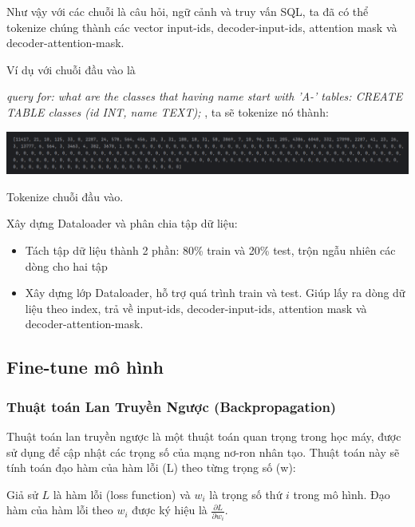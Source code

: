 \documentclass[a4paper, 10pt]{article}
\begin{document}
Như vậy với các chuỗi là câu hỏi, ngữ cảnh và truy vấn SQL, ta đã có thể tokenize chúng thành các vector input-ids, decoder-input-ids, attention mask và decoder-attention-mask.

Ví dụ với chuỗi đầu vào là 

\textit{query for: what are the classes that having name start with 'A-' tables: CREATE TABLE classes (id INT, name TEXT); }, ta sẽ tokenize nó thành:


\vspace{0.2cm}
\begin{minipage}{\linewidth}
    \captionsetup{type=figure}
    \centering
    \includegraphics[width=14cm]{./input_ids.png}
    \caption{Tokenize chuỗi đầu vào.}
\end{minipage}

\vspace{0.5cm}
Xây dựng Dataloader và phân chia tập dữ liệu:
\begin{itemize}
    \item Tách tập dữ liệu thành 2 phần: 80\% train và 20\% test, trộn ngẫu nhiên các dòng cho hai tập
    \item Xây dựng lớp Dataloader, hỗ trợ quá trình train và test. Giúp lấy ra dòng dữ liệu theo index, trả về input-ids, decoder-input-ids, attention mask và decoder-attention-mask.
\end{itemize}

\subsection{Fine-tune mô hình}

\subsubsection{Thuật toán Lan Truyền Ngược (Backpropagation)}

Thuật toán lan truyền ngược là một thuật toán quan trọng trong học máy, được sử dụng để cập nhật các trọng số của mạng nơ-ron nhân tạo.
Thuật toán này sẽ tính toán đạo hàm của hàm lỗi (L) theo từng trọng số (w): 

Giả sử \( L \) là hàm lỗi (loss function) và \( w_i \) là trọng số thứ \( i \) trong mô hình. Đạo hàm của hàm lỗi theo \( w_i \) được ký hiệu là \( \frac{\partial L}{\partial w_i} \).
\end{document}
